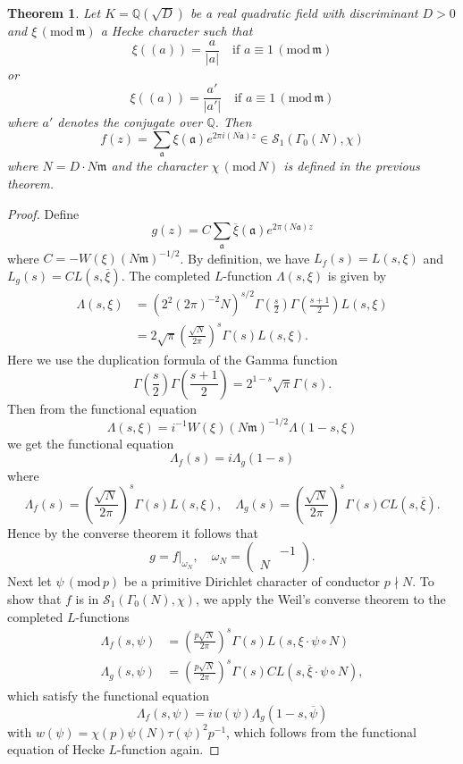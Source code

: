 \documentclass{article}
\newtheorem{theorem}{Theorem}
\newcommand{\Mod}[1]{\,(\mathrm{mod}\,#1)}
\begin{document}
\begin{theorem}
Let $K= \mathbb{Q}(\sqrt{D})$ be a real quadratic field with discriminant $D>0$ and $\xi\Mod{\mathfrak{m}}$ a Hecke character such that 
$$
\xi((a)) = \frac{a}{|a|}\quad \text{if }a\equiv 1\Mod{\mathfrak{m}} 
$$
or
$$
\xi((a)) = \frac{a'}{|a'|}\quad \text{if }a\equiv 1\Mod{\mathfrak{m}} 
$$
where $a'$ denotes the conjugate over $\mathbb{Q}$. Then 
$$
f(z) = \sum_{\mathfrak{a}} \xi(\mathfrak{a}) e^{2\pi i (N\mathfrak{a}) z} \in \mathcal{S}_{1}(\Gamma_{0}(N), \chi)
$$
where $N = D\cdot N\mathfrak{m}$ and the character $\chi\Mod{N}$ is defined in the previous theorem. 
\end{theorem}
\begin{proof}
Define 
$$
g(z) = C\sum_{\mathfrak{a}} \overline{\xi}(\mathfrak{a}) e^{2\pi (N\mathfrak{a})z}
$$
where $C = -W(\xi)(N\mathfrak{m})^{-1/2}$. By definition, we have $L_{f}(s) = L(s, \xi)$ and $L_{g}(s) = CL(s, \overline{\xi})$. The completed $L$-function $\Lambda(s, \xi)$ is given by 
\begin{align*}
\Lambda(s, \xi) &= (2^{2}(2\pi)^{-2}N)^{s/2}\Gamma\left(\frac{s}{2}\right)\Gamma\left(\frac{s+1}{2}\right)L(s, \xi) \\
&=2\sqrt{\pi} \left(\frac{\sqrt{N}}{2\pi}\right)^{s}\Gamma(s)L(s, \xi).
\end{align*}
Here we use the duplication formula of the Gamma function
$$
\Gamma\left(\frac{s}{2}\right)\Gamma\left(\frac{s+1}{2}\right) = 2^{1-s}\sqrt{\pi}\Gamma(s). 
$$
Then from the functional equation 
$$
\Lambda(s, \xi) = i^{-1}W(\xi)(N\mathfrak{m})^{-1/2}\Lambda(1-s, \xi)
$$
we get the functional equation 
$$
\Lambda_{f}(s) = i\Lambda_{g}(1-s)
$$
where 
$$
\Lambda_{f}(s) =\left(\frac{\sqrt{N}}{2\pi}\right)^{s} \Gamma(s) L(s, \xi), \quad \Lambda_{g}(s) =\left(\frac{\sqrt{N}}{2\pi}\right)^{s} \Gamma(s) CL(s, \overline{\xi}).
$$
Hence by the converse theorem it follows that 
$$
g = f|_{\omega_{N}}, \quad \omega_{N} = \begin{pmatrix} & -1 \\ N & \end{pmatrix}. 
$$
Next let $\psi\Mod{p}$ be a primitive Dirichlet character of conductor $p\nmid N$. 
To show that $f$ is in $\mathcal{S}_{1}(\Gamma_{0}(N), \chi)$, we apply the Weil's converse theorem to the completed $L$-functions 
\begin{align*}
\Lambda_{f}(s, \psi) &= \left(\frac{p\sqrt{N}}{2\pi}\right)^{s} \Gamma(s) L\left(s, \xi\cdot \psi\circ N\right) \\
\Lambda_{g}(s, \psi) &= \left(\frac{p\sqrt{N}}{2\pi}\right)^{s} \Gamma(s) CL\left(s, \overline{\xi}\cdot \psi\circ N\right), 
\end{align*}
which satisfy the functional equation $$\Lambda_{f}(s, \psi) = iw(\psi)\Lambda_{g}(1-s, \overline{\psi})$$
with $w(\psi) = \chi(p)\psi(N)\tau(\psi)^{2}p^{-1}$, which follows from the functional equation of Hecke $L$-function again. 
\end{proof}
\end{document}
